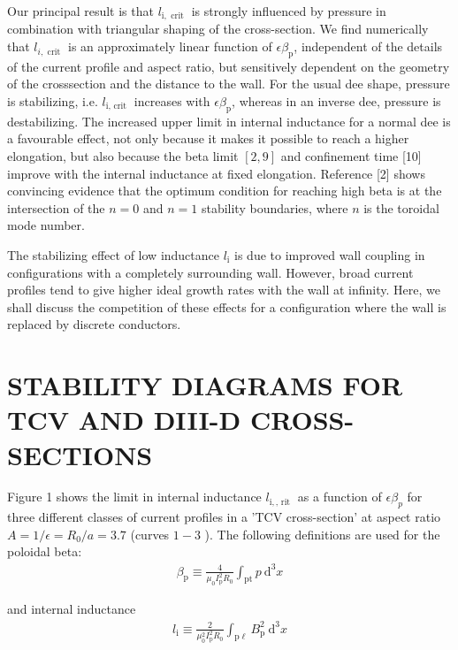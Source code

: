\documentclass[utf8]{ctexart}
\begin{document}
\begin{sloppypar}
 
 Our principal result is that $l_{\mathrm{i}, \text { crit }}$ is strongly influenced by pressure in combination with triangular shaping of the cross-section. We find numerically that $l_{i, \text { crit }}$ is an approximately linear function of $\epsilon \beta_{\mathrm{p}}$, independent of the details of the current profile and aspect ratio, but sensitively dependent on the geometry of the crosssection and the distance to the wall. For the usual dee shape, pressure is stabilizing, i.e. $l_{\mathrm{i} \text {, crit }}$ increases with $\epsilon \beta_{\mathrm{p}}$, whereas in an inverse dee, pressure is destabilizing. The increased upper limit in internal inductance for a normal dee is a favourable effect, not only because it makes it possible to reach a higher elongation, but also because the beta limit $[2,9]$ and confinement time [10] improve with the internal inductance at fixed elongation. Reference [2] shows convincing evidence that the optimum condition for reaching high beta is at the intersection of the $n=0$ and $n=1$ stability boundaries, where $n$ is the toroidal mode number.
 
 The stabilizing effect of low inductance $l_{\mathrm{i}}$ is due to improved wall coupling in configurations with a completely surrounding wall. However, broad current profiles tend to give higher ideal growth rates with the wall at infinity. Here, we shall discuss the competition of these effects for a configuration where the wall is replaced by discrete conductors.
 
 \section{STABILITY DIAGRAMS FOR TCV AND DIII-D CROSS-SECTIONS}
 Figure 1 shows the limit in internal inductance $l_{\mathrm{i}, \text {, rit }}$ as a function of $\epsilon \beta_{p}$ for three different classes of current profiles in a 'TCV cross-section' at aspect ratio $A=1 / \epsilon=R_{0} / a=3.7$ (curves $1-3$ ). The following definitions are used for the poloidal beta:
\begin{align*}
	 \beta_{\mathrm{p}} \equiv \frac{4}{\mu_{0} I_{\mathrm{p}}^{2} R_{0}} \int_{\mathrm{pt}} p \mathrm{~d}^{3} x
\end{align*}
 
  and internal inductance
 \begin{align*}
 l_{\mathrm{i}} \equiv \frac{2}{\mu_{0}^{2} I_{\mathrm{p}}^{2} R_{0}} \int_{\mathrm{p} \ell} B_{\mathrm{p}}^{2} \mathrm{~d}^{3} x
 \end{align*}
 

\end{sloppypar}
\end{document}

